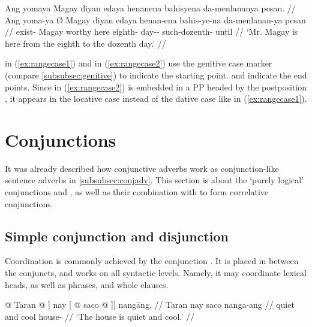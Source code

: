 \a\label{ex:rangecase2}\begingl
	\gla Ang yomaya {} Magay diyan edaya henanena bahisyena da-menlananya 
		pesan. //
	\glb Ang yoma-ya Ø Magay diyan edaya henan-ena bahis-ye-na 
		da-menlanan-ya pesan //
	\glc \AgtT{} exist-\TsgM{} \Top{} Magay worthy here eighth-\Gen{} 
		day-\Pl{}-\Gen{} such-dozenth-\Loc{} until //
	\glft `Mr. Magay is here from the eighth to the dozenth day.' //
\endgl

\xe

 in (\ref{ex:rangecase1}) and
 in (\ref{ex:rangecase2}) use the
genitive case marker  (compare \autoref{subsubsec:genitive}) to
indicate the starting point.  and
 indicate 
the end points. Since  in (\ref{ex:rangecase2}) is 
embedded in a PP headed by the postposition , it appears in 
the locative case instead of the dative case like  in 
(\ref{ex:rangecase1}).



\section{Conjunctions}
\label{sec:conjunctions}

It was already described how conjunctive adverbs work as conjunction-like 
sentence adverbs in \autoref{subsubsec:conjadv}. This section is 
about the `purely logical' conjunctions  and 
, as well as their combination with 
 to form correlative conjunctions.

\subsection{Simple conjunction and disjunction}


Coordination is commonly achieved by the conjunction . It is
placed in between the conjuncts, and works on all syntactic levels. Namely, it
may coordinate lexical heads, as well as phrases, and whole clauses.

\pex\label{ex:and}
\a\label{ex:andheads}\begingl
	\gla {\normalfont [\tsup{AP}[\tsup{A}} @ Taran @ {\normalfont ]} nay  
		{\normalfont [} @ saco @ {\normalfont ]]} nangāng. //
	\glb {} Taran {} nay {} saco {} nanga-ang //
	\glc {} quiet {} and {} cool {} house-\Aarg{} //
	\glft `The house is quiet and cool.' //
\endgl

